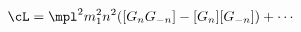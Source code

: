 \begin{equation}
\cL =
\mpl^2 m_1^2 n^2 ([G_n G_{-n}] - [G_n] [G_{-n}] )+ \cdots \label{l2gg}
\end{equation}

